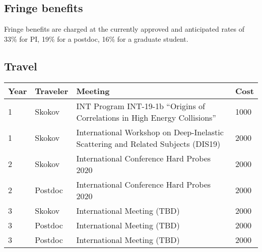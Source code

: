 \documentclass{DOEproposal}
\begin{document}
		\subsection*{Fringe benefits} 
		\vspace{0.5em}			
	
		\noindent 	
		Fringe benefits are charged at the currently approved and anticipated rates of 33\%
		for PI, 19\% for a postdoc, 
		16\% for a graduate student.%
		\vspace{1.2em}			

		\subsection*{Travel} 

		\vspace{0.5em}			
		
		\begin{center}
{%
\begin{tabular}{|l|l|p{90mm}|l| }
\hline
Year &  Traveler \hspace{0.5cm}  &  Meeting  & Cost   \\
\hline
1 &  Skokov  &  INT Program INT-19-1b
``Origins of Correlations in High Energy Collisions'' & 1000   \\
\hline
1  & Skokov  & International Workshop on Deep-Inelastic Scattering and Related Subjects (DIS19)   & 2000   \\ \hline
2  & Skokov  & International Conference Hard Probes 2020  &  2000   \\ \hline
2  & Postdoc  & 
 International Conference Hard Probes 2020 
 &  2000  \\ \hline
3  & Skokov  & International Meeting (TBD) &  2000  \\ \hline
3 & Postdoc &  International Meeting (TBD) &  2000\\ \hline
3 & Postdoc  & International Meeting (TBD) &  2000 \\ \hline
\end{tabular}
}
\end{center}
			
				

  
\end{document}

